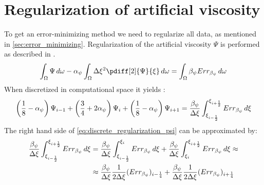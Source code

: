 \section{Regularization of artificial viscosity}\label{sec:regularization_artificial_viscosity}
To get an error-minimizing method we need to regularize all data, as mentioned in \autoref{sec:error_minimizing}.
Regularization of the artificial viscosity $\Psi$ is performed as described in \citet[eq.\ 14]{Borsboom2001}.
\begin{align}
    \int_\Omega \Psi\, d\omega - \alpha_{\psi} \int_\Omega \Dxi^2 \pdiff[2]{\Psi}{\xi}\, d\omega = \int_\Omega \beta_{\psi} Err_{\beta_{\psi}}\, d\omega
\end{align}
When discretized in computational space it yields \citep[eq.\ 18]{Borsboom2001}:
\begin{align}
    \left(\frac{1}{8} - \alpha_{\psi} \right)\Psi_{i-1} +
    \left(\frac{3}{4} + 2\alpha_{\psi} \right)\Psi_{i} +
    \left(\frac{1}{8} - \alpha_{\psi} \right)\Psi_{i+1} = \frac{\beta_{\psi}}{\Delta \xi} \int^{\xi_{i+\frac{1}{2}}}_{\xi_{i-\frac{1}{2}}} Err_{\beta_{\psi}}\, d\xi
    \label{eq:discrete_regularization_psi}
\end{align}
%
The right hand side of \autoref{eq:discrete_regularization_psi} can be approximated by:
\begin{align}
    \frac{\beta_{\psi}}{\Delta \xi} \int^{\xi_{i+\frac{1}{2}}}_{\xi_{i-\frac{1}{2}}} Err_{\beta_{\psi}}\, d\xi
& =
    \frac{\beta_{\psi}}{\Delta \xi} \int^{\xi_{i}}_{\xi_{i-\frac{1}{2}}} Err_{\beta_{\psi}}\, d\xi
    + \frac{\beta_{\psi}}{\Delta \xi} \int^{\xi_{i+\frac{1}{2}}}_{\xi_{i}} Err_{\beta_{\psi}}\, d\xi \approx
    \\*
    &\approx \frac{\beta_{\psi}}{\Delta \xi} \frac{1}{2\Delta \xi} (Err_{\beta_{\psi}})_{i-\frac{1}{4}}
  + \frac{\beta_{\psi}}{\Delta \xi} \frac{1}{2\Delta \xi} (Err_{\beta_{\psi}})_{i+\frac{1}{4}}
\end{align}
